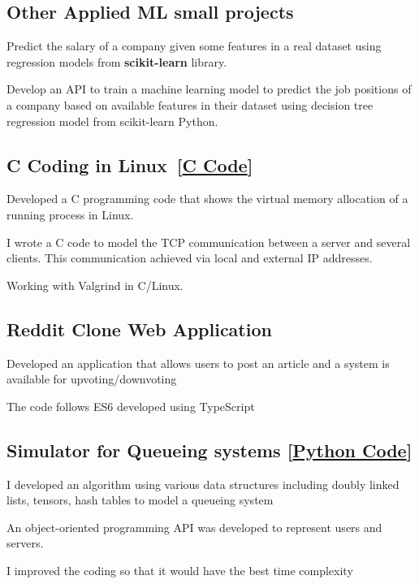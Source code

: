 \documentclass[letter,11pt]{article}
\begin{document}
\subsection{Other Applied ML small projects}
\begin{zitemize}
	\item Predict the salary of a company given some features in a real dataset using regression models from \textbf{scikit-learn} library.
	\item Develop an API to train a machine learning model to predict the job positions of a company based on available features in their dataset using decision tree regression model from scikit-learn Python.
\end{zitemize}

\subsection{C Coding in Linux~[\href{https://github.com/Hadi2525/vmemory_maps}{C Code}]}
\begin{zitemize}
	\item Developed a C programming code that shows the virtual memory allocation of a running process in Linux. 
	\item I wrote a C code to model the TCP communication between a server and several clients. This communication achieved via local and external IP addresses.
	\item Working with Valgrind in C/Linux.
\end{zitemize}
\subsection{Reddit Clone Web Application}
\begin{zitemize}
	\item Developed an application that allows users to post an article and a system is available for upvoting/downvoting
	\item The code follows ES6 developed using TypeScript
\end{zitemize}
\subsection{Simulator for Queueing systems [\href{https://github.com/Hadi2525/queueing_theory}{Python Code}]}
\begin{zitemize}
	\item I developed an algorithm using various data structures including doubly linked lists, tensors, hash tables to model a queueing system
	\item An object-oriented programming API was developed to represent users and servers.
	\item I improved the coding so that it would have the best time complexity 
\end{zitemize}
\end{document}
